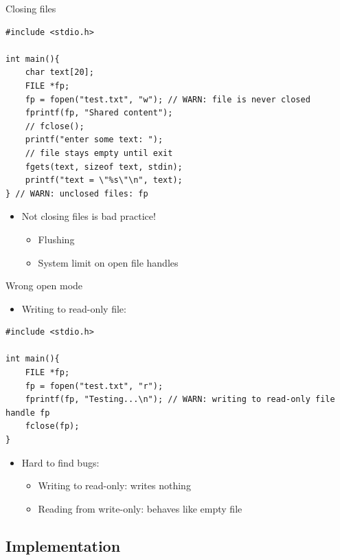 \documentclass{beamer}
\begin{document}
\begin{frame}[fragile]{Closing files}
\begin{lstlisting}
#include <stdio.h>

int main(){
    char text[20];
    FILE *fp;
    fp = fopen("test.txt", "w"); // WARN: file is never closed
    fprintf(fp, "Shared content");
    // fclose();
    printf("enter some text: ");
    // file stays empty until exit
    fgets(text, sizeof text, stdin);
    printf("text = \"%s\"\n", text);
} // WARN: unclosed files: fp
\end{lstlisting}
\begin{itemize}
\item Not closing files is bad practice!
	\begin{itemize}
	\item Flushing
	\item System limit on open file handles
	\end{itemize}
\end{itemize}
\end{frame}

\begin{frame}[fragile]{Wrong open mode}
\begin{itemize}
\item Writing to read-only file:
\end{itemize}
\begin{lstlisting}
#include <stdio.h>

int main(){
    FILE *fp;
    fp = fopen("test.txt", "r"); 
    fprintf(fp, "Testing...\n"); // WARN: writing to read-only file handle fp
    fclose(fp);
}
\end{lstlisting}
\begin{itemize}
\item Hard to find bugs:
	\begin{itemize}
	\item Writing to read-only: writes nothing
	\item Reading from write-only: behaves like empty file
	\end{itemize}
\end{itemize}
\end{frame}

\subsection{Implementation}
\end{document}
